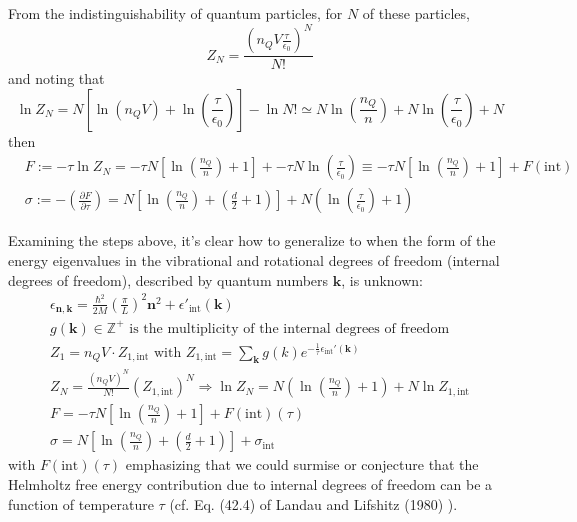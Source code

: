 \documentclass[10pt]{amsart}
\begin{document}
\begin{multicols*}{2}
From the indistinguishability of quantum particles, for $N$ of these particles,
\[
Z_N = \frac{ (n_Q V \frac{ \tau}{\epsilon_0 } )^N }{ N!} 
\]
and noting that 
\[
\ln{Z_N} = N\left[ \ln{ (n_Q V)} + \ln{ \left( \frac{\tau}{\epsilon_0 } \right) } \right] - \ln{N!} \simeq N \ln{ \left( \frac{n_Q}{n} \right) } + N \ln{ \left( \frac{\tau}{\epsilon_0 } \right) } + N 
\]
then
\[
\begin{aligned}
  & F := -\tau \ln{Z_N} = -\tau N \left[ \ln{ \left( \frac{n_Q}{n} \right) } + 1 \right] + - \tau N \ln{ \left( \frac{\tau}{\epsilon_0 } \right) } \equiv - \tau N \left[ \ln{ \left( \frac{n_Q}{n} \right) } + 1 \right] + F(\text{int}) \\ 
  & \sigma := -\left( \frac{ \partial F}{ \partial \tau } \right) = N \left[ \ln{ \left( \frac{n_Q}{n} \right) } + \left( \frac{d}{2} + 1 \right) \right] + N \left( \ln{ \left( \frac{\tau}{\epsilon_0} \right) } + 1 \right)
\end{aligned}
\]

Examining the steps above, it's clear how to generalize to when the form of the energy eigenvalues in the vibrational and rotational degrees of freedom (internal degrees of freedom), described by quantum numbers $\mathbf{k}$, is unknown:
\[
\begin{gathered}
  \epsilon_{\mathbf{n},\mathbf{k}} = \frac{ \hbar^2}{2M} \left( \frac{\pi}{L} \right)^2 \mathbf{n}^2  + \epsilon'_{\text{int}}(\mathbf{k}) \\
  g(\mathbf{k}) \in \mathbb{Z}^+ \text{ is the multiplicity of the internal degrees of freedom } \\ 
  Z_1 = n_Q V \cdot Z_{1,\text{int}} \text{ with } Z_{1,\text{int}} = \sum_{\mathbf{k}} g(k) e^{ -\frac{1}{\tau} \epsilon_{\text{int}}'(\mathbf{k}) } \\ 
  Z_N = \frac{ (n_Q V)^N}{N!} (Z_{1,\text{int}})^N  \Longrightarrow \ln{Z_N} = N \left( \ln{ \left( \frac{n_Q}{n} \right) } + 1 \right) + N \ln{ Z_{1,\text{int}} } \\ 
  F = -\tau N \left[ \ln{ \left( \frac{n_Q}{n} \right) + 1 } \right] + F(\text{int})(\tau) \\ 
  \sigma = N \left[ \ln{ \left( \frac{n_Q}{n} \right) } + \left( \frac{d}{2} + 1 \right) \right] + \sigma_{\text{int}}
\end{gathered}
\]
with $F(\text{int})(\tau)$ emphasizing that we could surmise or conjecture that the Helmholtz free energy contribution due to internal degrees of freedom can be a function of temperature $\tau$ (cf. Eq. (42.4) of Landau and Lifshitz (1980) \cite{LLandauELifshitz1980}).  




\end{multicols*}
\end{document}

